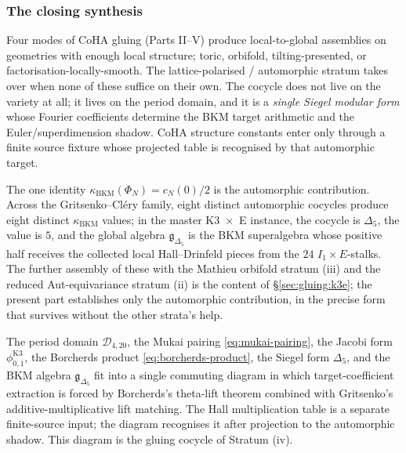 \subsubsection{The closing synthesis}

Four modes of CoHA gluing (Parts II--V) produce local-to-global assemblies on geometries with enough local structure; toric, orbifold, tilting-presented, or factorisation-locally-smooth. The lattice-polarised / automorphic stratum takes over when none of these suffice on their own. The cocycle does not live on the variety at all; it lives on the period domain, and it is a \emph{single Siegel modular form} whose Fourier coefficients determine the BKM target arithmetic and the Euler/superdimension shadow. CoHA structure constants enter only through a finite source fixture whose projected table is recognised by that automorphic target.

The one identity $\kappa_{\mathrm{BKM}}(\Phi_N) = c_N(0) / 2$ is the automorphic contribution. Across the Gritsenko--Cl\'ery family, eight distinct automorphic cocycles produce eight distinct $\kappa_{\mathrm{BKM}}$ values; in the master K3~$\times$~E instance, the cocycle is $\Delta_5$, the value is $5$, and the global algebra $\mathfrak g_{\Delta_5}$ is the BKM superalgebra whose positive half receives the collected local Hall--Drinfeld pieces from the $24$ $I_1 \times E$-stalks. The further assembly of these with the Mathieu orbifold stratum (iii) and the reduced Aut-equivariance stratum (ii) is the content of \S\ref{sec:gluing:k3e}; the present part establishes only the automorphic contribution, in the precise form that survives without the other strata's help.

The period domain $\mathcal D_{4, 20}$, the Mukai pairing \eqref{eq:mukai-pairing}, the Jacobi form $\phi_{0, 1}^{\mathrm{K3}}$, the Borcherds product \eqref{eq:borcherds-product}, the Siegel form $\Delta_5$, and the BKM algebra $\mathfrak g_{\Delta_5}$ fit into a single commuting diagram in which target-coefficient extraction is forced by Borcherds's theta-lift theorem combined with Gritsenko's additive-multiplicative lift matching. The Hall multiplication table is a separate finite-source input; the diagram recognises it after projection to the automorphic shadow. This diagram is the gluing cocycle of Stratum (iv).
